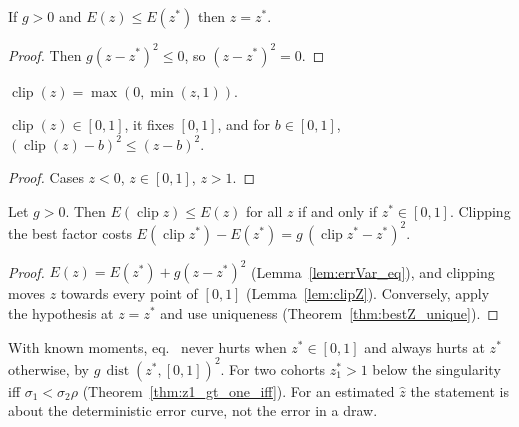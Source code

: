 \begin{theorem}\label{thm:bestZ_unique}
  \leanok
  If $g > 0$ and $E(z) \le E(z^*)$ then $z = z^*$.
\end{theorem}
\begin{proof}
  \leanok
  Then $g(z - z^*)^2 \le 0$, so $(z - z^*)^2 = 0$.
\end{proof}

\begin{definition}\label{def:clipZ}
  \leanok
  $\operatorname{clip}(z) = \max(0, \min(z, 1))$.
\end{definition}

\begin{lemma}\label{lem:clipZ}
  \leanok
  $\operatorname{clip}(z) \in [0, 1]$, it fixes $[0, 1]$, and for $b \in [0, 1]$,
  $(\operatorname{clip}(z) - b)^2 \le (z - b)^2$.
\end{lemma}
\begin{proof}
  \leanok
  Cases $z < 0$, $z \in [0, 1]$, $z > 1$.
\end{proof}

\begin{theorem}\label{thm:clipZ}
  \leanok
  Let $g > 0$. Then $E(\operatorname{clip} z) \le E(z)$ for all $z$ if and only if
  $z^* \in [0, 1]$. Clipping the best factor costs
  $E(\operatorname{clip} z^*) - E(z^*) = g\,(\operatorname{clip} z^* - z^*)^2$.
\end{theorem}
\begin{proof}
  \leanok
  $E(z) = E(z^*) + g(z - z^*)^2$ (Lemma~\ref{lem:errVar_eq}), and clipping moves $z$
  towards every point of $[0, 1]$ (Lemma~\ref{lem:clipZ}). Conversely, apply the hypothesis
  at $z = z^*$ and use uniqueness (Theorem~\ref{thm:bestZ_unique}).
\end{proof}

\begin{remark}\label{rem:clipZ}
  With known moments, eq.~ never hurts when $z^* \in [0, 1]$ and always hurts at
  $z^*$ otherwise, by $g\,\operatorname{dist}(z^*, [0, 1])^2$. For two cohorts $z_1^* > 1$
  below the singularity iff $\sigma_1 < \sigma_2\rho$ (Theorem~\ref{thm:z1_gt_one_iff}).
  For an estimated $\hat z$ the statement is about the deterministic error curve, not the
  error in a draw.
\end{remark}

